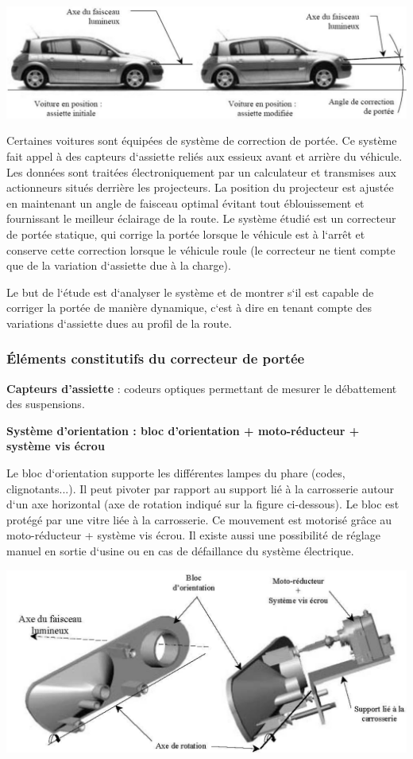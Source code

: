 \begin{center}
 \includegraphics[width=.6\textwidth]{png/image1}
\end{center}
     
         Certaines voitures sont équipées de système de correction de portée. Ce
système fait appel à
des capteurs d‘assiette reliés aux essieux avant et arrière du véhicule. Les
données sont traitées
électroniquement par un calculateur et transmises aux actionneurs situés
derrière les projecteurs. La
position du projecteur est ajustée en maintenant un angle de faisceau optimal
évitant tout
éblouissement et fournissant le meilleur éclairage de la route.
Le système étudié est un correcteur de portée statique, qui corrige la portée
lorsque le véhicule est à
l‘arrêt et conserve cette correction lorsque le véhicule roule (le correcteur ne
tient compte que de la
variation d‘assiette due à la charge).

       Le but de l‘étude est d‘analyser le système et de montrer s‘il est
capable de corriger la portée
de manière dynamique, c‘est à dire en tenant compte des variations d‘assiette
dues au profil de la
route.

\subsubsection{Éléments constitutifs du correcteur de portée}

\textbf{Capteurs d’assiette} : codeurs optiques permettant de mesurer le
débattement des suspensions.

\textbf{Système d’orientation : bloc d’orientation + moto-réducteur + système
vis écrou}

Le bloc d‘orientation supporte les différentes lampes du phare (codes,
clignotants...). Il peut pivoter
par rapport au support lié à la carrosserie autour d‘un axe horizontal (axe de
rotation indiqué sur la
figure ci-dessous). Le bloc est protégé par une vitre liée à la carrosserie. Ce
mouvement est motorisé
grâce au moto-réducteur + système vis écrou. Il existe aussi une possibilité de
réglage manuel en
sortie d‘usine ou en cas de défaillance du système électrique.

\begin{center}
 \includegraphics[width=.6\textwidth]{png/image2}
\end{center}

